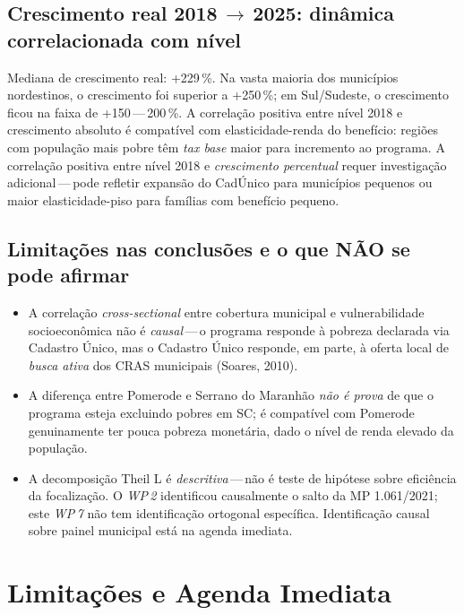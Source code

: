 \documentclass[12pt,a4paper,oneside]{article}
\begin{document}
\subsection{Crescimento real 2018\,$\rightarrow$\,2025: dinâmica
correlacionada com nível}

Mediana de crescimento real: +229\,\%. Na vasta maioria dos municípios
nordestinos, o crescimento foi superior a +250\,\%; em Sul/Sudeste, o
crescimento ficou na faixa de +150\,---\,200\,\%. A correlação positiva entre
nível 2018 e crescimento absoluto é compatível com elasticidade-renda do
benefício: regiões com população mais pobre têm \textit{tax base} maior
para incremento ao programa. A correlação positiva entre nível 2018 e
\textit{crescimento percentual} requer investigação adicional\,---\,pode
refletir expansão do CadÚnico para municípios pequenos ou maior
elasticidade-piso para famílias com benefício pequeno.

\subsection{Limitações nas conclusões e o que NÃO se pode afirmar}

\begin{itemize}\itemsep3pt
\item A correlação \textit{cross-sectional} entre cobertura municipal e
  vulnerabilidade socioeconômica não é \textit{causal}\,---\,o programa
  responde à pobreza declarada via Cadastro Único, mas o Cadastro Único
  responde, em parte, à oferta local de \textit{busca ativa} dos CRAS
  municipais (Soares, 2010).
\item A diferença entre Pomerode e Serrano do Maranhão \textit{não é
  prova} de que o programa esteja excluindo pobres em SC; é compatível
  com Pomerode genuinamente ter pouca pobreza monetária, dado o nível de
  renda elevado da população.
\item A decomposição Theil L é \textit{descritiva}\,---\,não é teste de
  hipótese sobre eficiência da focalização. O \textit{WP\,2}
  identificou causalmente o salto da MP 1.061/2021; este \textit{WP\,7} não
  tem identificação ortogonal específica. Identificação causal sobre painel
  municipal está na agenda imediata.
\end{itemize}

\section{Limitações e Agenda Imediata}\label{sec:limitacoes}
\end{document}

